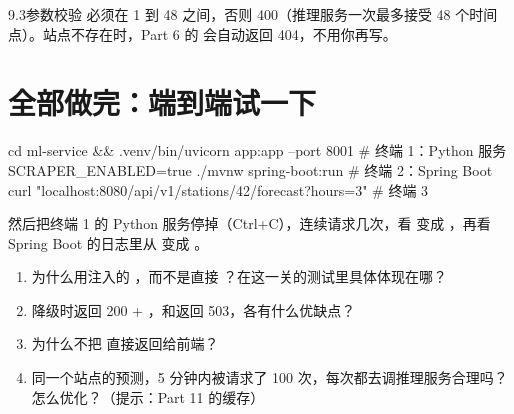 \begin{task}{9.3\quad 参数校验}
 必须在 1 到 48 之间，否则 400（推理服务一次最多接受 48 个时间点）。站点不存在时，Part 6 的  会自动返回 404，不用你再写。
\end{task}

\section{全部做完：端到端试一下}

\begin{shell}
cd ml-service && .venv/bin/uvicorn app:app --port 8001        # 终端 1：Python 服务
SCRAPER_ENABLED=true ./mvnw spring-boot:run                    # 终端 2：Spring Boot
curl "localhost:8080/api/v1/stations/42/forecast?hours=3"      # 终端 3
\end{shell}

然后把终端 1 的 Python 服务停掉（Ctrl+C），连续请求几次，看  变成 ，再看 Spring Boot 的日志里从  变成 。

\begin{think}
\begin{enumerate}
  \item 为什么用注入的 ，而不是直接 ？在这一关的测试里具体体现在哪？
  \item 降级时返回 200 + ，和返回 503，各有什么优缺点？
  \item 为什么不把  直接返回给前端？
  \item 同一个站点的预测，5 分钟内被请求了 100 次，每次都去调推理服务合理吗？怎么优化？（提示：Part 11 的缓存）
\end{enumerate}
\end{think}
